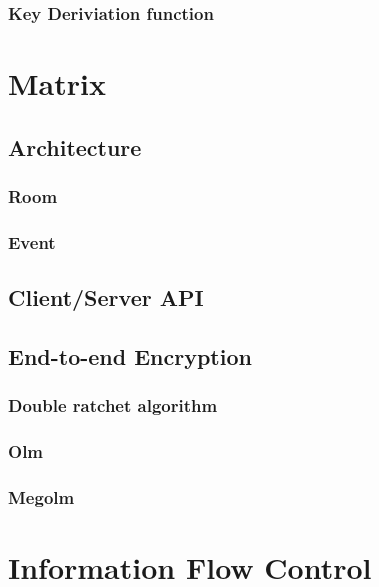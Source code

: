 \subsubsection{Key Deriviation function}

\section{Matrix} %

\subsection{Architecture}

\subsubsection{Room}

\subsubsection{Event}


\subsection{Client/Server API}

\subsection{End-to-end Encryption}

\subsubsection{Double ratchet algorithm}

\subsubsection{Olm}

\subsubsection{Megolm}



\section{Information Flow Control} %

